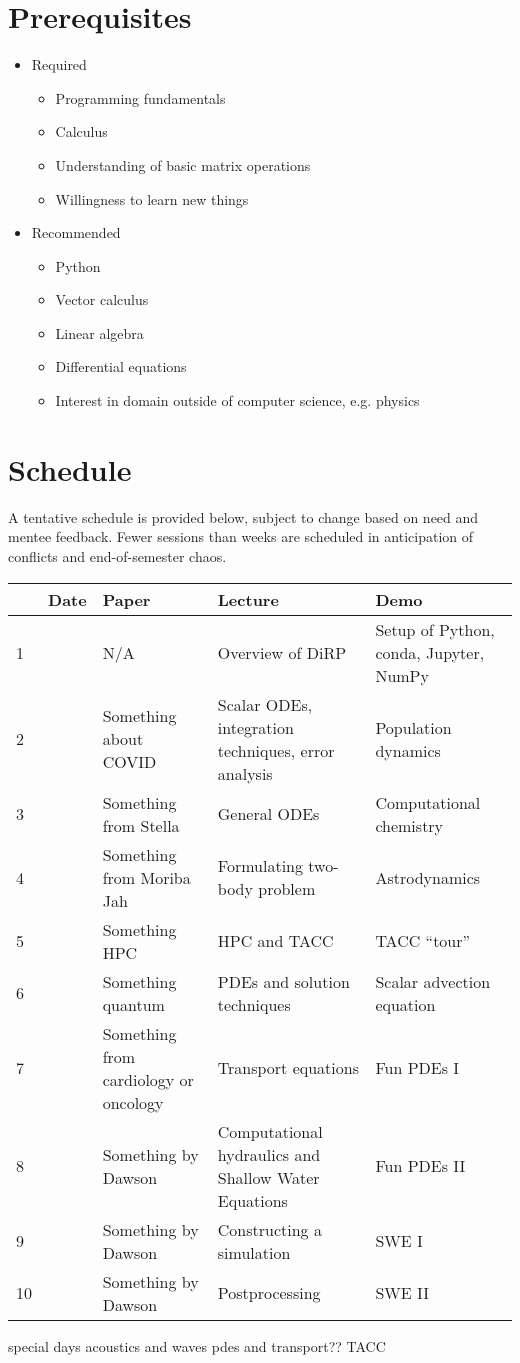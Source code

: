 \documentclass{article}
\begin{document}
	\section*{Prerequisites}
	\begin{itemize}
		\item Required
		\begin{itemize}
			\item Programming fundamentals
			\item Calculus
			\item Understanding of basic matrix operations
			\item Willingness to learn new things
		\end{itemize}
		\item Recommended
		\begin{itemize}
			\item Python
			\item Vector calculus
			\item Linear algebra
			\item Differential equations
			\item Interest in domain outside of computer science, e.g. physics
		\end{itemize}
	\end{itemize}

	\section*{Schedule}
	A tentative schedule is provided below, subject to change based on need and mentee feedback. Fewer sessions than weeks are scheduled in anticipation of conflicts and end-of-semester chaos.
	
	\begin{tabular}{l|llp{4cm}p{4cm}}
		& Date & Paper & Lecture & Demo \\
		\hline
		1 &  & N/A & Overview of DiRP & Setup of Python, conda, Jupyter, NumPy \\
		\hline
		2 &  & Something about COVID & Scalar ODEs, integration techniques, error analysis & Population dynamics \\
		\hline
		3 &  & Something from Stella & General ODEs & Computational chemistry \\
		\hline
		4 &  & Something from Moriba Jah & Formulating two-body problem & Astrodynamics \\
		\hline
		5 &  & Something HPC & HPC and TACC & TACC ``tour'' \\
		\hline
		6 &  & Something quantum & PDEs and solution techniques & Scalar advection equation \\
		\hline
		7 &  & Something from cardiology or oncology & Transport equations & Fun PDEs I \\
		\hline
		8 &  & Something by Dawson & Computational hydraulics and Shallow Water Equations & Fun PDEs II \\
		\hline
		9 &  & Something by Dawson & Constructing a simulation & SWE I \\
		\hline
		10 &  & Something by Dawson & Postprocessing & SWE II \\
	\end{tabular}
	
	special days
	acoustics and waves
	pdes and transport??
	TACC
\end{document}
